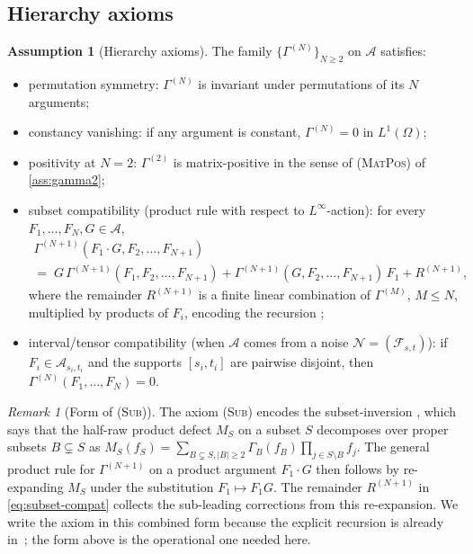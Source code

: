 \documentclass[11pt,reqno]{amsart}
\theoremstyle{plain}
\theoremstyle{definition}
\newtheorem{assumption}[theorem]{Assumption}
\theoremstyle{remark}
\newtheorem{remark}[theorem]{Remark}
\newcommand{\cA}{\mathcal A}
\newcommand{\cF}{\mathcal F}
\newcommand{\cN}{\mathcal N}
\begin{document}
\subsection{Hierarchy axioms}\label{sec:hierarchy-axioms}

\begin{assumption}[Hierarchy axioms]\label{ass:hierarchy}
The family $\{\Gamma^{(N)}\}_{N\ge 2}$ on $\cA$ satisfies:
\begin{itemize}
\item[\textsc{(Sym)}] permutation symmetry: $\Gamma^{(N)}$ is
invariant under permutations of its $N$ arguments;
\item[\textsc{(Vanish)}] constancy vanishing: if any argument is
constant, $\Gamma^{(N)}=0$ in $L^{1}(\Omega)$;
\item[\textsc{(MatPos2)}] positivity at $N=2$: $\Gamma^{(2)}$
is matrix-positive in the sense of \textsc{(MatPos)} of
\cref{ass:gamma2};
\item[\textsc{(Sub)}] subset compatibility (product rule with
respect to $L^{\infty}$-action): for every $F_{1},\ldots,F_{N},G\in\cA$,
\begin{multline}\label{eq:subset-compat}
  \Gamma^{(N+1)}(F_{1}\!\cdot\!G,F_{2},\ldots,F_{N+1})\\
  =\;G\,\Gamma^{(N+1)}(F_{1},F_{2},\ldots,F_{N+1})
  +\Gamma^{(N+1)}(G,F_{2},\ldots,F_{N+1})\,F_{1}+R^{(N+1)},
\end{multline}
where the remainder $R^{(N+1)}$ is a finite linear combination
of $\Gamma^{(M)}$, $M\le N$, multiplied by products of $F_{i}$,
encoding the recursion \cite[Eq.~(6.10)]{PrimitiveDivergence};
\item[\textsc{(Tens)}] interval/tensor compatibility (when $\cA$
comes from a noise $\cN=(\cF_{s,t})$): if $F_{i}\in\cA_{s_{i},t_{i}}$
and the supports $[s_{i},t_{i}]$ are pairwise disjoint, then
$\Gamma^{(N)}(F_{1},\ldots,F_{N})=0$.
\end{itemize}
\end{assumption}

\begin{remark}[Form of \textsc{(Sub)}]\label{rem:sub-form}
The axiom \textsc{(Sub)} encodes the subset-inversion
\cite[Eq.~(6.10)]{PrimitiveDivergence}, which says that the
half-raw product defect $M_{S}$ on a subset $S$ decomposes over
proper subsets $B\subsetneq S$ as
$M_{S}(f_{S})=\sum_{B\subsetneq S,|B|\ge 2}\Gamma_{B}(f_{B})\prod_{j\in S\setminus B}f_{j}$.
The general product rule for $\Gamma^{(N+1)}$ on a product
argument $F_{1}\cdot G$ then follows by re-expanding $M_{S}$
under the substitution $F_{1}\mapsto F_{1}G$. The remainder
$R^{(N+1)}$ in \eqref{eq:subset-compat} collects the
sub-leading corrections from this re-expansion. We write the
axiom in this combined form because the explicit recursion is
already in~\cite{PrimitiveDivergence}; the form above is the
operational one needed here.
\end{remark}
\end{document}
